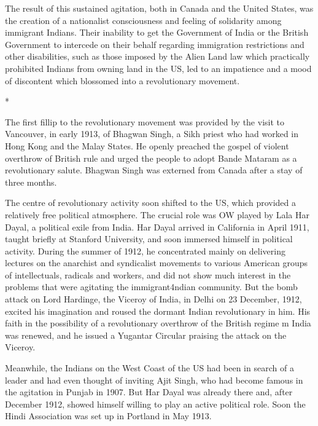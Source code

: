 The result of this sustained agitation, both in Canada and the United States, was the creation of a nationalist consciousness and feeling of solidarity among immigrant Indians. Their inability to get the Government of India or the British Government to intercede on their behalf regarding immigration restrictions and other disabilities, such as those imposed by the Alien Land law which practically prohibited Indians from owning land in the US, led to an impatience and a mood of discontent which blossomed into a revolutionary movement.

\begin{center}*\end{center}



The first fillip to the revolutionary movement was provided by the visit to Vancouver, in early 1913, of Bhagwan Singh, a Sikh priest who had worked in Hong Kong and the Malay States. He openly preached the gospel of violent overthrow of British rule and urged the people to adopt Bande Mataram as a revolutionary salute. Bhagwan Singh was externed from Canada after a stay of three months.

The centre of revolutionary activity soon shifted to the US, which provided a relatively free political atmosphere. The crucial role was OW played by Lala Har Dayal, a political exile from India. Har Dayal arrived in California in April 1911, taught briefly at Stanford University, and soon immersed himself in political activity. During the summer of 1912, he concentrated mainly on delivering lectures on the anarchist and syndicalist movements to various American groups of intellectuals, radicals and workers, and did not show much interest in the problems that were agitating the immigrant4ndian community. But the bomb attack on Lord Hardinge, the Viceroy of India, in Delhi on 23 December, 1912, excited his imagination and roused the dormant Indian revolutionary in him. His faith in the possibility of a revolutionary overthrow of the British regime m India was renewed, and he issued a Yugantar Circular praising the attack on the Viceroy.

Meanwhile, the Indians on the West Coast of the US had been in search of a leader and had even thought of inviting Ajit Singh, who had become famous in the agitation in Punjab in 1907. But Har Dayal was already there and, after December 1912, showed himself willing to play an active political role. Soon the Hindi Association was set up in Portland in May 1913.

